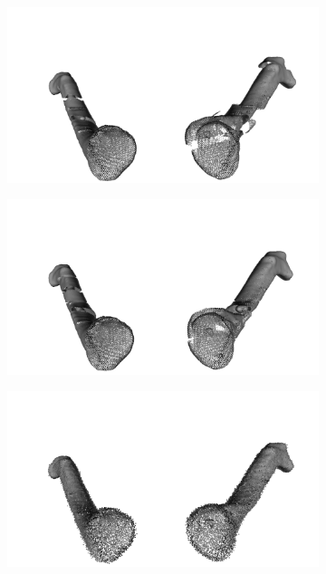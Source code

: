 \begin{figure}[htp]
\begin{subfigure}[b]{.5\textwidth}
  \end{subfigure}
  \hfill
  \begin{subfigure}[b]{.5\textwidth}
    \centering
    \includegraphics[width=\textwidth]{imagenes/chapter2/clavicula/clavicula_3.png}
  \end{subfigure}
  \begin{subfigure}[b]{.5\textwidth}
    \centering
    \includegraphics[width=\textwidth]{imagenes/chapter2/clavicula/clavicula_4.png}
  \end{subfigure}
  \begin{subfigure}[b]{.5\textwidth}
    \centering
    \includegraphics[width=\textwidth]{imagenes/chapter2/clavicula/clavicula_5.png}

\end{subfigure}
\end{figure}
